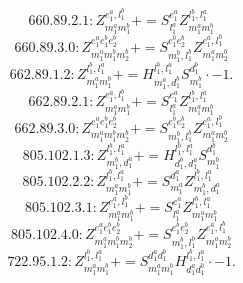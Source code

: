 \documentclass[letterpaper,10pt,fleqn,leqno,onecolumn]{article}
\begin{document}
\begin{equation} \;\;\;\;\;\;  660.89.2.1: Z^{e_{1}^{a},l_{1}^{b}}_{m_{1}^{a}m_{1}^{b}}+=S^{e_{1}^{a}}_{l_{1}^{a}}Z^{l_{1}^{b},l_{1}^{a}}_{m_{1}^{a}m_{1}^{b}} \end{equation}
\begin{equation} \;\;\;\;\;\;  660.89.3.0: Z^{e_{1}^{a}e_{1}^{b}e_{2}^{b}}_{m_{1}^{a}m_{1}^{b}m_{2}^{b}}+=S^{e_{1}^{b}e_{2}^{b}}_{m_{1}^{b},l_{1}^{b}}Z^{e_{1}^{a},l_{1}^{b}}_{m_{1}^{a}m_{2}^{b}} \end{equation}
\begin{equation} \;\;\;\;\;\;  662.89.1.2: Z^{l_{1}^{b},l_{1}^{a}}_{m_{1}^{a}m_{1}^{b}}+=H^{l_{1}^{b},l_{1}^{a}}_{m_{1}^{a},d_{1}^{b}}S^{d_{1}^{b}}_{m_{1}^{b}}\cdot -1. \end{equation}
\begin{equation} \;\;\;\;\;\;  662.89.2.1: Z^{e_{1}^{a},l_{1}^{b}}_{m_{1}^{a}m_{1}^{b}}+=S^{e_{1}^{a}}_{l_{1}^{a}}Z^{l_{1}^{b},l_{1}^{a}}_{m_{1}^{a}m_{1}^{b}} \end{equation}
\begin{equation} \;\;\;\;\;\;  662.89.3.0: Z^{e_{1}^{a}e_{1}^{b}e_{2}^{b}}_{m_{1}^{a}m_{1}^{b}m_{2}^{b}}+=S^{e_{1}^{b}e_{2}^{b}}_{m_{1}^{b},l_{1}^{b}}Z^{e_{1}^{a},l_{1}^{b}}_{m_{1}^{a}m_{2}^{b}} \end{equation}
\begin{equation} \;\;\;\;\;\;  805.102.1.3: Z^{l_{1}^{b},l_{1}^{a}}_{m_{1}^{b},d_{1}^{a}}+=H^{l_{1}^{b},l_{1}^{a}}_{d_{1}^{b},d_{1}^{a}}S^{d_{1}^{b}}_{m_{1}^{b}} \end{equation}
\begin{equation} \;\;\;\;\;\;  805.102.2.2: Z^{l_{1}^{b},l_{1}^{a}}_{m_{1}^{a}m_{1}^{b}}+=S^{d_{1}^{a}}_{m_{1}^{a}}Z^{l_{1}^{b},l_{1}^{a}}_{m_{1}^{b},d_{1}^{a}} \end{equation}
\begin{equation} \;\;\;\;\;\;  805.102.3.1: Z^{e_{1}^{a},l_{1}^{b}}_{m_{1}^{a}m_{1}^{b}}+=S^{e_{1}^{a}}_{l_{1}^{a}}Z^{l_{1}^{b},l_{1}^{a}}_{m_{1}^{a}m_{1}^{b}} \end{equation}
\begin{equation} \;\;\;\;\;\;  805.102.4.0: Z^{e_{1}^{a}e_{1}^{b}e_{2}^{b}}_{m_{1}^{a}m_{1}^{b}m_{2}^{b}}+=S^{e_{1}^{b}e_{2}^{b}}_{m_{1}^{b},l_{1}^{b}}Z^{e_{1}^{a},l_{1}^{b}}_{m_{1}^{a}m_{2}^{b}} \end{equation}
\begin{equation} \;\;\;\;\;\;  722.95.1.2: Z^{l_{1}^{b},l_{1}^{a}}_{m_{1}^{a}m_{1}^{b}}+=S^{d_{1}^{a}d_{1}^{b}}_{m_{1}^{a}m_{1}^{b}}H^{l_{1}^{b},l_{1}^{a}}_{d_{1}^{a}d_{1}^{b}}\cdot -1. \end{equation}
\end{document}
